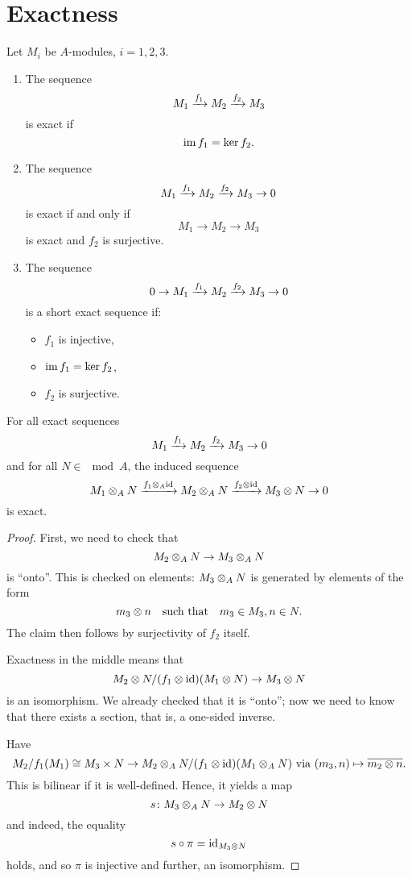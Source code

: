 \section{Exactness}

\begin{df}
  Let $M_i$ be $A$-modules, $i = 1, 2, 3$.
  \begin{enumerate}
  \item The sequence
    \[ M_1 \xrightarrow{f_1} M_2 \xrightarrow{f_2} M_3\]
    is exact if
    \[ \operatorname*{im} f_1 = \ker f_2.\]
  \item The sequence
    \[ M_1 \xrightarrow{f_1} M_2 \xrightarrow{f_2} M_3 \to 0\]
    is exact if and only if
    \[ M_1 \to M_2 \to M_3\]
    is exact and $f_2$ is surjective.
  \item The sequence
    \[ 0 \to M_1 \xrightarrow{f_1} M_2 \xrightarrow{f_2} M_3 \to 0\]
    is a short exact sequence if:
    \begin{itemize}
    \item $f_1$ is injective,
    \item $\operatorname*{im} f_1 = \ker f_2$,
    \item $f_2$ is surjective.
    \end{itemize}
  \end{enumerate}
\end{df}

\begin{prop}
  \label{tensor-right-exact}
  For all exact sequences
  \[ M_1 \xrightarrow{f_1} M_2 \xrightarrow{f_2} M_3 \to 0\]
  and for all $N \in \mod{A}$, the induced sequence
  \[ M_1 \otimes_A N \xrightarrow{f_1 \otimes_A \text{id}} M_2 \otimes_A N \xrightarrow{f_2 \otimes \text{id}} M_3 \otimes N \to 0\]
  is exact.
\end{prop}
\begin{proof}
  First, we need to check that
  \[ M_2 \otimes_A N \to M_3 \otimes_A N\]
  is ``onto''. This is checked on elements: $M_3 \otimes_A N$ is generated by elements of the form
  \[ m_3 \otimes n \quad \text{such that} \quad m_3 \in M_3, n \in N.\]
  The claim then follows by surjectivity of $f_2$ itself.

  Exactness in the middle means that
  \[ M_2 \otimes N / {(f_1 \otimes \text{id})(M_1 \otimes N)} \to M_3 \otimes N\]
  is an isomorphism. We already checked that it is ``onto''; now we need to know that there exists a section, that is, a one-sided inverse.

  Have
  \[ M_2 /{f_1(M_1)} \cong M_3 \times N \to M_2 \otimes_A N /{(f_1 \otimes \text{id})(M_1 \otimes_A N)} \text{ via } (m_3, n) \mapsto \overline{m_2 \otimes n}.\]
  This is bilinear if it is well-defined.
  Hence, it yields a  map
  \[ s \colon M_3 \otimes_A N \to M_2 \otimes N\]
  and indeed, the equality
  \[ s \circ \pi = \text{id}_{M_3 \otimes N}\]
  holds, and so $\pi$ is injective and further, an isomorphism.
\end{proof}

